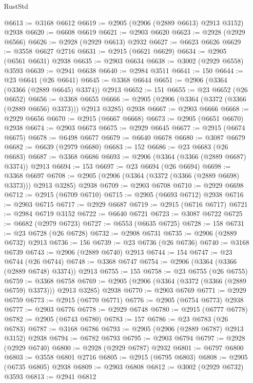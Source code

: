 \begin{lexlean}{RustStd}
\begin{coremodule}
@6613 := @3168 @6612
@6619 := @2905 (@2906 (@2889 @6613) @2913 @3152) @2938
@6620 := @6608 @6619
@6621 := @2903 @6620
@6623 := @2928 (@2929 @6566)
@6626 := @2928 (@2929 @6613) @2932
@6627 := @6623 @6626
@6629 := @3558 @6627 @2716
@6631 := @2915 (@6621 @6629)
@6634 := @2905 (@6561 @6631) @2938
@6635 := @2903 @6634
@6638 := @3002 (@2929 @6558) @3593
@6639 := @2941 @6638
@6640 := @2984 @3511
@6641 := 150
@6644 := @23 @6641 (@26 @6641)
@6645 := @3368 @6644
@6651 := @2906 (@3364 (@3366 (@2889 @6645) @3374)) @2913
@6652 := 151
@6655 := @23 @6652 (@26 @6652)
@6656 := @3368 @6655
@6666 := @2905 (@2906 (@3364 (@3372 (@3366 (@2889 @6656) @3373))) @2913 @3285) @2938
@6667 := @2903 @6666
@6668 := @2929 @6656
@6670 := @2915 (@6667 @6668)
@6673 := @2905 (@6651 @6670) @2938
@6674 := @2903 @6673
@6675 := @2929 @6645
@6677 := @2915 (@6674 @6675)
@6678 := @6498 @6677
@6679 := @6640 @6678
@6680 := @3087 @6679
@6682 := @6639 (@2979 @6680)
@6683 := 152
@6686 := @23 @6683 (@26 @6683)
@6687 := @3368 @6686
@6693 := @2906 (@3364 (@3366 (@2889 @6687) @3374)) @2913
@6694 := 153
@6697 := @23 @6694 (@26 @6694)
@6698 := @3368 @6697
@6708 := @2905 (@2906 (@3364 (@3372 (@3366 (@2889 @6698) @3373))) @2913 @3285) @2938
@6709 := @2903 @6708
@6710 := @2929 @6698
@6712 := @2915 (@6709 @6710)
@6715 := @2905 (@6693 @6712) @2938
@6716 := @2903 @6715
@6717 := @2929 @6687
@6719 := @2915 (@6716 @6717)
@6721 := @2984 @6719 @3152
@6722 := @6640 @6721
@6723 := @3087 @6722
@6725 := @6682 (@2979 @6723)
@6727 := @6553 (@6635 @6725)
@6728 := 158
@6731 := @23 @6728 (@26 @6728)
@6732 := @2908 @6731
@6735 := @2906 (@2889 @6732) @2913
@6736 := 156
@6739 := @23 @6736 (@26 @6736)
@6740 := @3168 @6739
@6743 := @2906 (@2889 @6740) @2913
@6744 := 154
@6747 := @23 @6744 (@26 @6744)
@6748 := @3368 @6747
@6754 := @2906 (@3364 (@3366 (@2889 @6748) @3374)) @2913
@6755 := 155
@6758 := @23 @6755 (@26 @6755)
@6759 := @3368 @6758
@6769 := @2905 (@2906 (@3364 (@3372 (@3366 (@2889 @6759) @3373))) @2913 @3285) @2938
@6770 := @2903 @6769
@6771 := @2929 @6759
@6773 := @2915 (@6770 @6771)
@6776 := @2905 (@6754 @6773) @2938
@6777 := @2903 @6776
@6778 := @2929 @6748
@6780 := @2915 (@6777 @6778)
@6782 := @2905 (@6743 @6780)
@6783 := 157
@6786 := @23 @6783 (@26 @6783)
@6787 := @3168 @6786
@6793 := @2905 (@2906 (@2889 @6787) @2913 @3152) @2938
@6794 := @6782 @6793
@6795 := @2903 @6794
@6797 := @2928 (@2929 @6740)
@6800 := @2928 (@2929 @6787) @2932
@6801 := @6797 @6800
@6803 := @3558 @6801 @2716
@6805 := @2915 (@6795 @6803)
@6808 := @2905 (@6735 @6805) @2938
@6809 := @2903 @6808
@6812 := @3002 (@2929 @6732) @3593
@6813 := @2941 @6812

\end{coremodule}
\end{lexlean}

